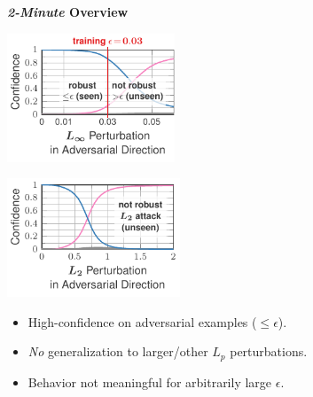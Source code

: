 \documentclass[64pt]{beamer}
\begin{document}
	\begin{frame}[t]{\bfseries \textit{2-Minute} Overview}
		\Large
		
		\begin{tcolorbox}[
			enhanced,
			boxsep=0pt,
			left=5pt,
			right=5pt,
			top=2pt,
			toptitle=4pt,
			bottomtitle=2pt,
			bottom=2pt,
			colback=white,
			colframe=white,
			width=1\textwidth, 
			enlarge left by=0mm,
			arc=0pt,outer arc=0pt,
			boxrule=1pt,
			title=Summary of adversarial training:,
			coltitle=MPIIblack,
			colbacktitle=white,
			titlerule style=white,
			]
			
			\centering
			\begin{minipage}[t]{0.45\textwidth}
				\vspace*{0px}
				\hfill
				\includegraphics[width=5cm]{fig/introduction/advtrain_1_adversarial_unseen}
			\end{minipage}
			\begin{minipage}[t]{0.45\textwidth}
				\vspace*{7px}
				\hfill
				\includegraphics[width=5.15cm]{fig/introduction/advtrain_3_l2_adversarial}
			\end{minipage}
			\vspace*{-2px}
		\end{tcolorbox}
		\vspace*{-0.5cm}
		
		\begin{itemize}
			\item High-confidence on adversarial examples (${\leq}\epsilon$).
			\item \emph{No} generalization to larger/other $L_p$ perturbations.
			\item Behavior not meaningful for arbitrarily large $\epsilon$.
		\end{itemize}
	\end{frame}
\end{document}
